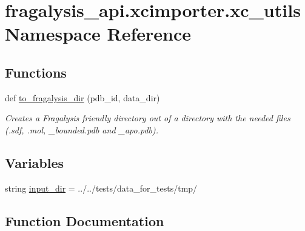 \hypertarget{namespacefragalysis__api_1_1xcimporter_1_1xc__utils}{}\section{fragalysis\+\_\+api.\+xcimporter.\+xc\+\_\+utils Namespace Reference}
\label{namespacefragalysis__api_1_1xcimporter_1_1xc__utils}
\subsection*{Functions}
\begin{DoxyCompactItemize}
\item 
def \hyperlink{namespacefragalysis__api_1_1xcimporter_1_1xc__utils_a20b9e349b37bfbf70c38bfaf1a42876f}{to\+\_\+fragalysis\+\_\+dir} (pdb\+\_\+id, data\+\_\+dir)
\begin{DoxyCompactList}\small\item\em Creates a Fragalysis friendly directory out of a directory with the needed files (.sdf, .mol, \+\_\+bounded.\+pdb and \+\_\+apo.\+pdb). \end{DoxyCompactList}\end{DoxyCompactItemize}
\subsection*{Variables}
\begin{DoxyCompactItemize}
\item 
string \hyperlink{namespacefragalysis__api_1_1xcimporter_1_1xc__utils_a8e1ebabddefaec139b57091c2aee7c87}{input\+\_\+dir} = \textquotesingle{}../../tests/data\+\_\+for\+\_\+tests/tmp/\textquotesingle{}
\end{DoxyCompactItemize}


\subsection{Function Documentation}
\mbox{\label{namespacefragalysis__api_1_1xcimporter_1_1xc__utils_a20b9e349b37bfbf70c38bfaf1a42876f}} 
